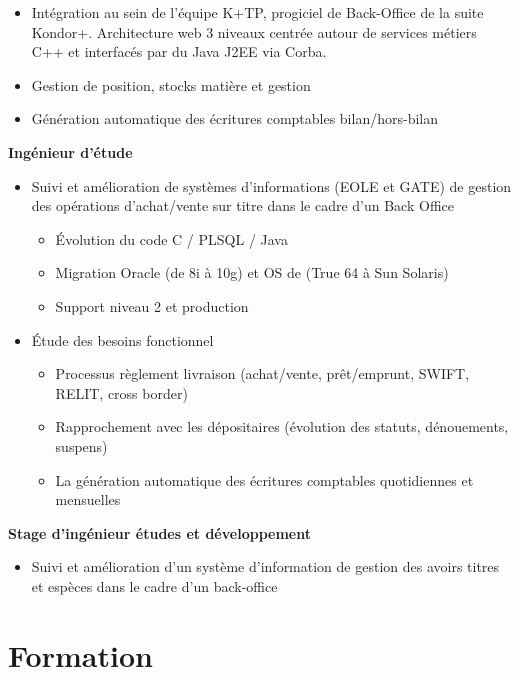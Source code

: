 \documentclass[11pt,a4paper]{moderncv}
\begin{document}
{\bigskip
			\begin{itemize}
				\item Intégration au sein de l’équipe K+TP, progiciel de Back-Office de la suite Kondor+. Architecture web 3 niveaux centrée autour de services métiers C++ et interfacés par du Java J2EE via Corba.
				\item Gestion de position, stocks matière et gestion
				\item Génération automatique des écritures comptables bilan/hors-bilan 
			\end{itemize}
}

\newpage

{
	\bigskip
	\textbf{Ingénieur d'étude}
\bigskip
\begin{itemize}
\item Suivi et amélioration de systèmes d’informations (EOLE et GATE) de gestion des opérations d’achat/vente sur titre dans le cadre d’un Back Office
	\begin{itemize}
		\item Évolution du code C / PLSQL / Java
		\item Migration Oracle (de 8i à 10g) et OS de (True 64 à Sun Solaris)
		\item Support niveau 2 et production
\end{itemize}
\bigskip
\item Étude des besoins fonctionnel
	\begin{itemize}
		\item Processus règlement livraison (achat/vente, prêt/emprunt, SWIFT, RELIT, cross border)
		\item Rapprochement avec les dépositaires (évolution des statuts, dénouements, suspens)
		\item La génération automatique des écritures comptables quotidiennes et mensuelles
	\end{itemize}
\end{itemize}
}
\bigskip
{}
{
\bigskip
\textbf{Stage d’ingénieur études et développement}
\bigskip
\begin{itemize}
	\item Suivi et amélioration d’un système d’information de gestion des avoirs titres et espèces dans le cadre d’un back-office
\end{itemize}
}
\section{Formation}
\end{document}
